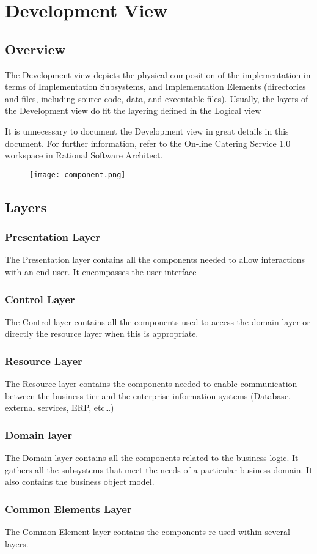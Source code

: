 \documentclass[10pt,a4paper]{article}
\begin{document}
\section{Development  View} 
\subsection{ Overview}

The Development view depicts the physical composition of the implementation in terms of Implementation Subsystems, and Implementation Elements (directories and files, including source code, data, and executable files). 
Usually, the layers of the Development view do fit the layering defined in the Logical view

It is unnecessary to document the Development view in great details in this document. For further information, refer to the On-line Catering Service 1.0 workspace in Rational Software Architect. 

\begin{figure}[H]
\texttt{[image: component.png]}
\end{figure}

\subsection{Layers}

\subsubsection{Presentation Layer}
The Presentation layer contains all the components needed to allow interactions with an end-user. It encompasses the user interface 
\subsubsection{	Control Layer}
The Control layer contains all the components used to access the domain layer or directly the resource layer when this is appropriate. 

\subsubsection{	Resource Layer}
The Resource layer contains the components needed to enable communication between the business tier and the enterprise information systems (Database, external services, ERP, etc…)

\subsubsection{	Domain layer}
The Domain layer contains all the components related to the business logic. It gathers all the subsystems that meet the needs of a particular business domain. It also contains the business object model.

\subsubsection{	Common Elements Layer}
The Common Element layer contains the components re-used within several layers.
\end{document}
